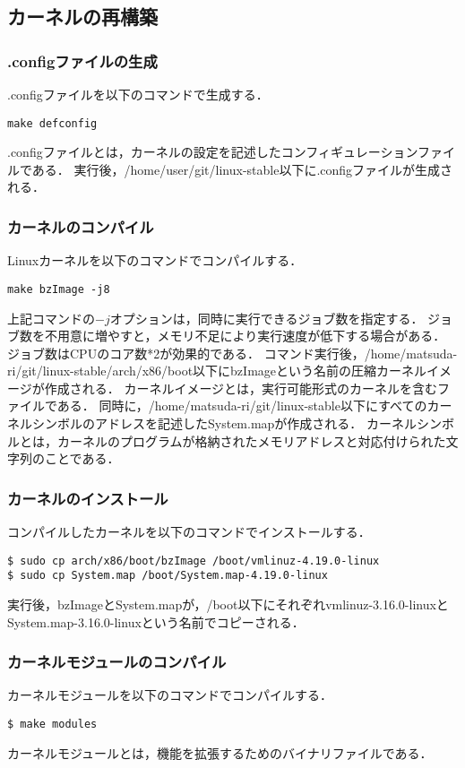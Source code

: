 \documentclass[12pt]{jsarticle}
\begin{document}
\subsection{カーネルの再構築}
\subsubsection{.configファイルの生成}
.configファイルを以下のコマンドで生成する．
\begin{verbatim}
make defconfig
\end{verbatim}
.configファイルとは，カーネルの設定を記述したコンフィギュレーションファイルである．
実行後，/home/user/git/linux-stable以下に.configファイルが生成される．

\subsubsection{カーネルのコンパイル}
Linuxカーネルを以下のコマンドでコンパイルする．
\begin{verbatim}
make bzImage -j8
\end{verbatim}
上記コマンドの$-j$オプションは，同時に実行できるジョブ数を指定する．
ジョブ数を不用意に増やすと，メモリ不足により実行速度が低下する場合がある．
ジョブ数はCPUのコア数*2が効果的である．
コマンド実行後，/home/matsuda-ri/git/linux-stable/arch/x86/boot以下にbzImageという名前の圧縮カーネルイメージが作成される．
カーネルイメージとは，実行可能形式のカーネルを含むファイルである．
同時に，/home/matsuda-ri/git/linux-stable以下にすべてのカーネルシンボルのアドレスを記述したSystem.mapが作成される．
カーネルシンボルとは，カーネルのプログラムが格納されたメモリアドレスと対応付けられた文字列のことである．

\subsubsection{カーネルのインストール}
コンパイルしたカーネルを以下のコマンドでインストールする．
\begin{verbatim}
$ sudo cp arch/x86/boot/bzImage /boot/vmlinuz-4.19.0-linux
$ sudo cp System.map /boot/System.map-4.19.0-linux
\end{verbatim}
実行後，bzImageとSystem.mapが，/boot以下にそれぞれvmlinuz-3.16.0-linuxとSystem.map-3.16.0-linuxという名前でコピーされる．

\subsubsection{カーネルモジュールのコンパイル}
カーネルモジュールを以下のコマンドでコンパイルする．
\begin{verbatim}
$ make modules
\end{verbatim}
カーネルモジュールとは，機能を拡張するためのバイナリファイルである．
\end{document}
